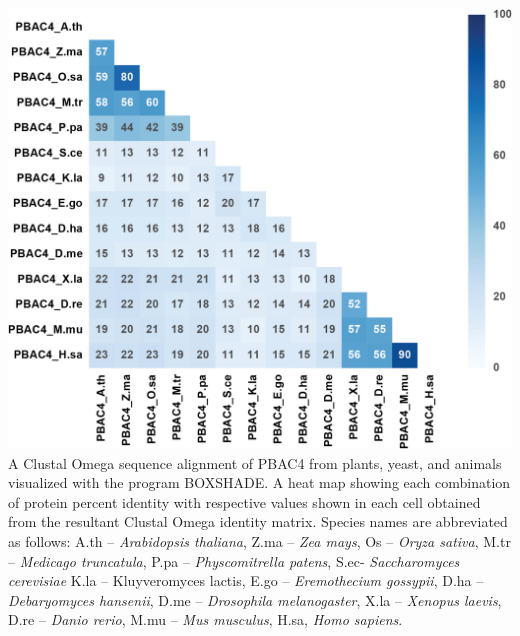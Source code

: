 \begin{FPfigure}
	\ContinuedFloat
	\centering
	\includegraphics[width=\columnwidth]{Proteasome/pbac4align2.png}
	{A Clustal Omega \citep{sievers14} sequence alignment of PBAC4 from plants, yeast, and animals visualized with the program BOXSHADE. A heat map showing each combination of protein percent identity with respective values shown in each cell obtained from the resultant Clustal Omega identity matrix. Species names are abbreviated as follows: A.th – \textit{Arabidopsis thaliana}, Z.ma – \textit{Zea mays}, Os – \textit{Oryza sativa}, M.tr – \textit{Medicago truncatula}, P.pa – \textit{Physcomitrella patens}, S.ec- \textit{Saccharomyces cerevisiae} K.la – {Kluyveromyces lactis}, E.go – \textit{Eremothecium gossypii}, D.ha – \textit{Debaryomyces hansenii}, D.me – \textit{Drosophila melanogaster}, X.la – \textit{Xenopus laevis}, D.re – \textit{Danio rerio}, M.mu – \textit{Mus musculus}, H.sa, \textit{Homo sapiens}.}
	\label{fig:pbac4align2}
\end{FPfigure}
\clearpage
